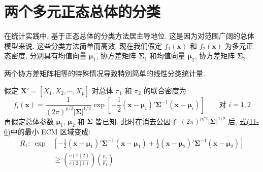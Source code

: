 \section{两个多元正态总体的分类}  %
\label{sec:11.3}

在统计实践中, 基于正态总体的分类方法居主导地位. 这是因为对范围广阔的总体模型来说, 这些分类方法简单而高效. 现在我们假定 $f_1(\mathbf{x})$ 和 $f_2(\mathbf{x})$ 为多元正态密度, 分别具有均值向量 $\boldsymbol{\mu}_1$, 协方差矩阵 $\boldsymbol{\Sigma}_1$ 和均值向量 $\boldsymbol{\mu}_2$, 协方差矩阵 $\boldsymbol{\Sigma}_2$.

两个协方差矩阵相等的特殊情况导致特别简单的线性分类统计量.


假定 $\mathbf{X}'=[X_1,X_2,\cdots,X_p]$ 对总体 $\pi_1$ 和 $\pi_2$ 的联合密度为
\label{eq:11-10}
\begin{equation}
f_i(\mathbf{x})=\frac{1}{(2\pi)^{p/2}|\boldsymbol{\Sigma}|^{1/2}}\exp\left[-\frac{1}{2}(\mathbf{x}-\boldsymbol{\mu}_i)'\boldsymbol{\Sigma}^{-1}(\mathbf{x}-\boldsymbol{\mu}_i)\right]\qquad \text{对 } i=1,2
\tag{11-10}
\end{equation}
再假定总体参数 $\boldsymbol{\mu}_1$, $\boldsymbol{\mu}_2$ 和 $\boldsymbol{\Sigma}$ 皆已知. 此时在消去公因子 $(2\pi)^{p/2}|\boldsymbol{\Sigma}|^{1/2}$ 后, \hyperref[eq:11-6]{式(11-6)}中的最小 ECM 区域变成:
\[
\begin{aligned}
R_1:\ \exp&\left[-\frac{1}{2}(\mathbf{x}-\boldsymbol{\mu}_1)'\boldsymbol{\Sigma}^{-1}(\mathbf{x}-\boldsymbol{\mu}_1)+\frac{1}{2}(\mathbf{x}-\boldsymbol{\mu}_2)'\boldsymbol{\Sigma}^{-1}(\mathbf{x}-\boldsymbol{\mu}_2)\right]\\
&\geqslant\left(\frac{c(1\mid2)}{c(2\mid1)}\right)\left(\frac{p_2}{p_1}\right)
\end{aligned}
\]
